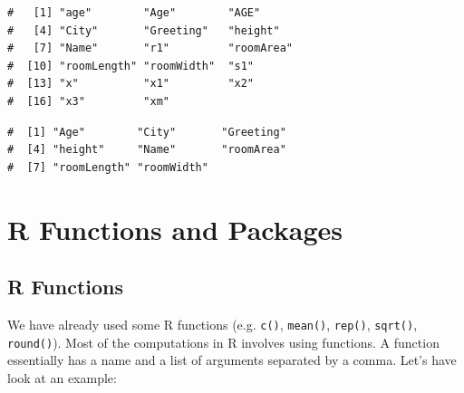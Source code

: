 \documentclass[a4paper,9pt,twocolumn,twoside,printwatermark=false]{pinp}
\begin{document}
\begin{Shaded}
\begin{Highlighting}[]
\NormalTok{()}
\end{Highlighting}
\end{Shaded}

\begin{ShadedResult}
\begin{verbatim}
#   [1] "age"        "Age"        "AGE"       
#   [4] "City"       "Greeting"   "height"    
#   [7] "Name"       "r1"         "roomArea"  
#  [10] "roomLength" "roomWidth"  "s1"        
#  [13] "x"          "x1"         "x2"        
#  [16] "x3"         "xm"
\end{verbatim}
\end{ShadedResult}

\begin{Shaded}
\begin{Highlighting}[]
\NormalTok{()}
\end{Highlighting}
\end{Shaded}

\begin{ShadedResult}
\begin{verbatim}
#  [1] "Age"        "City"       "Greeting"  
#  [4] "height"     "Name"       "roomArea"  
#  [7] "roomLength" "roomWidth"
\end{verbatim}
\end{ShadedResult}

\section{R Functions and Packages}\label{r-functions-and-packages}

\subsection{R Functions}\label{r-functions}

We have already used some R functions (e.g. \texttt{c()},
\texttt{mean()}, \texttt{rep()}, \texttt{sqrt()}, \texttt{round()}).
Most of the computations in R involves using functions. A function
essentially has a name and a list of arguments separated by a comma.
Let's have look at an example:

\begin{Shaded}
\begin{Highlighting}[]
\NormalTok{(} \NormalTok{, } \NormalTok{, } \NormalTok{)}
\end{Highlighting}
\end{Shaded}
\end{document}
